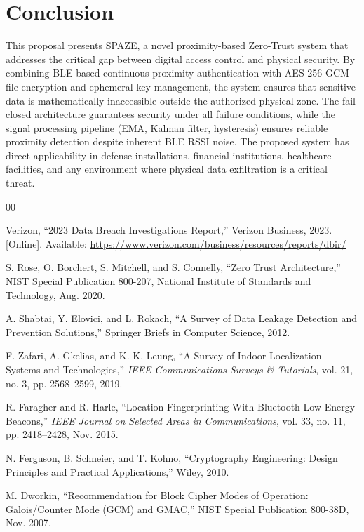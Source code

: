 \documentclass[conference]{IEEEtran}
\begin{document}
\section{Conclusion}

This proposal presents SPAZE, a novel proximity-based Zero-Trust system that addresses the critical gap between digital access control and physical security. By combining BLE-based continuous proximity authentication with AES-256-GCM file encryption and ephemeral key management, the system ensures that sensitive data is mathematically inaccessible outside the authorized physical zone. The fail-closed architecture guarantees security under all failure conditions, while the signal processing pipeline (EMA, Kalman filter, hysteresis) ensures reliable proximity detection despite inherent BLE RSSI noise. The proposed system has direct applicability in defense installations, financial institutions, healthcare facilities, and any environment where physical data exfiltration is a critical threat.

\begin{thebibliography}{00}

Verizon, ``2023 Data Breach Investigations Report,'' Verizon Business, 2023. [Online]. Available: \url{https://www.verizon.com/business/resources/reports/dbir/}

S. Rose, O. Borchert, S. Mitchell, and S. Connelly, ``Zero Trust Architecture,'' NIST Special Publication 800-207, National Institute of Standards and Technology, Aug. 2020.

A. Shabtai, Y. Elovici, and L. Rokach, ``A Survey of Data Leakage Detection and Prevention Solutions,'' Springer Briefs in Computer Science, 2012.

F. Zafari, A. Gkelias, and K. K. Leung, ``A Survey of Indoor Localization Systems and Technologies,'' \textit{IEEE Communications Surveys \& Tutorials}, vol. 21, no. 3, pp. 2568--2599, 2019.

R. Faragher and R. Harle, ``Location Fingerprinting With Bluetooth Low Energy Beacons,'' \textit{IEEE Journal on Selected Areas in Communications}, vol. 33, no. 11, pp. 2418--2428, Nov. 2015.

N. Ferguson, B. Schneier, and T. Kohno, ``Cryptography Engineering: Design Principles and Practical Applications,'' Wiley, 2010.

M. Dworkin, ``Recommendation for Block Cipher Modes of Operation: Galois/Counter Mode (GCM) and GMAC,'' NIST Special Publication 800-38D, Nov. 2007.

\end{thebibliography}
\end{document}
